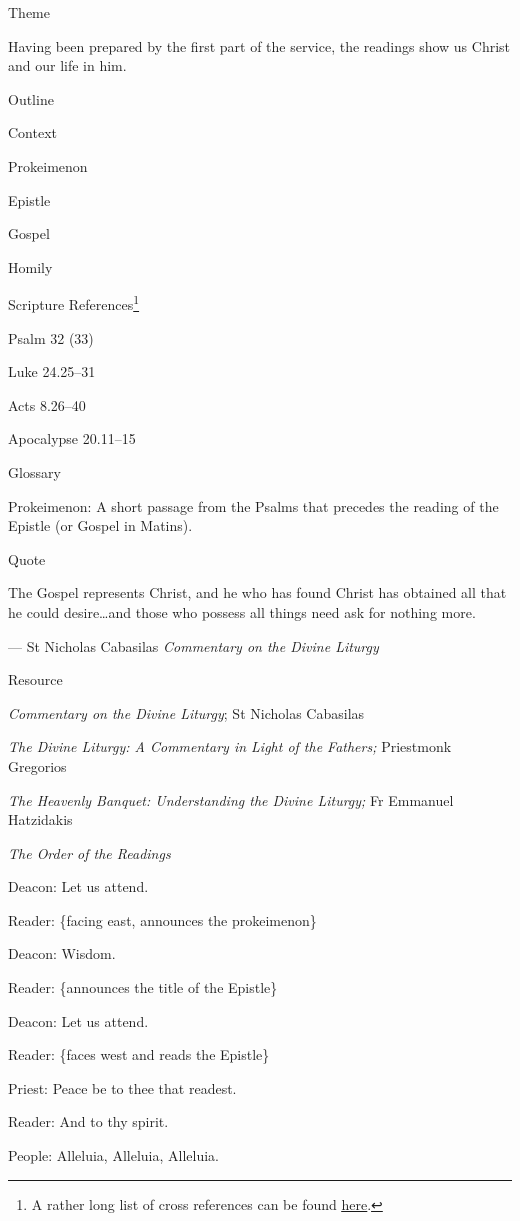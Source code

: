 \documentclass[
]{article}
\begin{document}
Theme

Having been prepared by the first part of the service, the readings show
us Christ and our life in him.

Outline

Context

Prokeimenon

Epistle

Gospel

Homily

Scripture References\footnote{A rather long list of cross references can
  be found
  \href{http://jimmyakin.com/deuterocanonical-references-in-the-new-testament}{\ul{here}}.}

Psalm 32 (33)

Luke 24.25--31

Acts 8.26--40

Apocalypse 20.11--15

Glossary

Prokeimenon: A short passage from the Psalms that precedes the reading
of the Epistle (or Gospel in Matins).

Quote

The Gospel represents Christ, and he who has found Christ has obtained
all that he could desire\ldots and those who possess all things need ask
for nothing more.

--- St Nicholas Cabasilas \emph{Commentary on the Divine Liturgy}

Resource

\emph{Commentary on the Divine Liturgy}; St Nicholas Cabasilas

\emph{The Divine Liturgy: A Commentary in Light of the Fathers;}
Priestmonk Gregorios

\emph{The Heavenly Banquet: Understanding the Divine Liturgy;} Fr
Emmanuel Hatzidakis

\emph{The Order of the Readings}

Deacon: Let us attend.

Reader: \{facing east, announces the prokeimenon\}

Deacon: Wisdom.

Reader: \{announces the title of the Epistle\}

Deacon: Let us attend.

Reader: \{faces west and reads the Epistle\}

Priest: Peace be to thee that readest.

Reader: And to thy spirit.

People: Alleluia, Alleluia, Alleluia.
\end{document}
